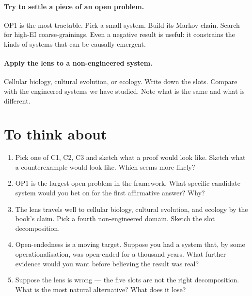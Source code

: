 \paragraph{Try to settle a piece of an open problem.} OP1 is the most
tractable. Pick a small system. Build its Markov chain. Search for
high-EI coarse-grainings. Even a negative result is useful: it
constrains the kinds of systems that can be causally emergent.

\paragraph{Apply the lens to a non-engineered system.} Cellular
biology, cultural evolution, or ecology. Write down the slots.
Compare with the engineered systems we have studied. Note what is
the same and what is different.

\section*{To think about}

\begin{enumerate}
  \item Pick one of C1, C2, C3 and sketch what a proof would look
    like. Sketch what a counterexample would look like. Which seems
    more likely?
  \item OP1 is the largest open problem in the framework. What
    specific candidate system would you bet on for the first
    affirmative answer? Why?
  \item The lens travels well to cellular biology, cultural
    evolution, and ecology by the book's claim. Pick a fourth
    non-engineered domain. Sketch the slot decomposition.
  \item Open-endedness is a moving target. Suppose you had a system
    that, by some operationalisation, was open-ended for a thousand
    years. What further evidence would you want before believing the
    result was real?
  \item Suppose the lens is wrong --- the five slots are not the
    right decomposition. What is the most natural alternative? What
    does it lose?
\end{enumerate}
